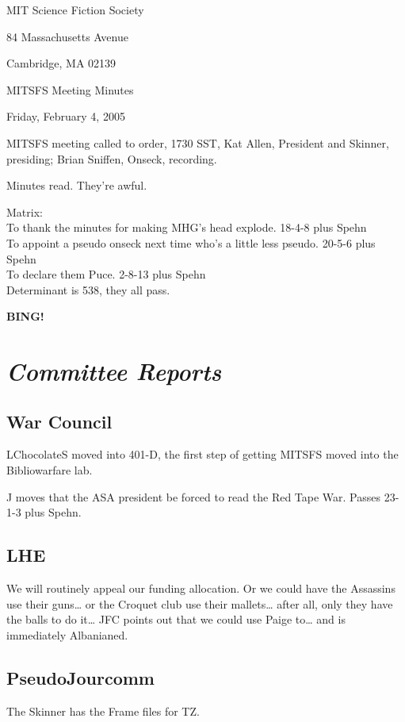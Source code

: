 \documentclass[10pt]{article}
\newcommand{\bing}{{\bf BING!} }
\newcommand{\goto}[1]{\bing \vskip 12pt \section*{{\em{#1}}}}
\newcommand{\ps}{ plus Spehn\xspace}
\begin{document}
\begin{center}

MIT Science Fiction Society

84 Massachusetts Avenue

Cambridge, MA 02139

\vspace{12pt}

MITSFS Meeting Minutes

Friday, February 4, 2005

\end{center}

\vspace{18pt}

\setlength{\parskip}{6pt}

\noindent
MITSFS meeting called to order, 1730 SST, Kat Allen, President and
Skinner, presiding; Brian Sniffen,  Onseck, recording.

Minutes read.  They're awful.

Matrix:\\
To thank the minutes for making MHG's head explode. 18-4-8\ps\\
To appoint a pseudo onseck next time who's a little less pseudo. 20-5-6\ps\\
To declare them Puce. 2-8-13\ps\\
Determinant is 538, they all pass.

\goto{Committee Reports}
\subsection*{War Council}
\textsf{LChocolateS} moved into 401-D, the first step of getting MITSFS moved
into the Bibliowarfare lab.

J moves that the ASA president be forced to read the Red Tape War.
Passes 23-1-3\ps.

\subsection*{LHE}

We will routinely appeal our funding allocation.  Or we could have the
Assassins use their guns\dots{} or the Croquet club use their
mallets\dots{} after all, only they have the balls to do it\dots{} JFC points
out that we could use Paige to\dots{} and is immediately Albanianed.

\subsection*{PseudoJourcomm}
The Skinner has the Frame files for TZ.
\end{document}
